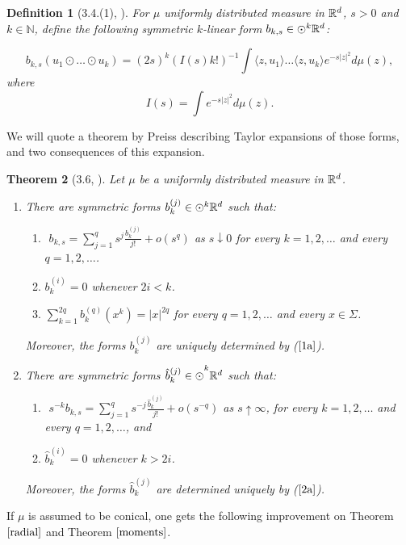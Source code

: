 \documentclass[11pt]{article}
\newtheorem{theorem}{Theorem}[section]
\newtheorem{definition}[theorem]{Definition}
\theoremstyle{definition}
\theoremstyle{remark}
\numberwithin{equation}{section}
\newcommand{\NN}{\mathbb{N}}
\begin{document}
\begin{definition}[3.4.(1), \cite{P}]
For $\mu$ uniformly distributed measure in $\mathbb{R}^d$, $s>0$ and $k \in \NN$, define the following symmetric $k$-linear form $b_{k,s} \in {\odot}^{k} {\mathbb{R}}^d$:

\begin{equation} 
b_{k,s}(u_1 \odot \ldots \odot u_k)= (2s)^k {(I(s) k!)}^{-1} \int \langle z,u_1 \rangle \ldots \langle z,u_k \rangle e^{-s|z|^{2}} d\mu(z), 
\end{equation}
where $$ I(s)= \int e^{-s|z|^2} d\mu(z). $$
\end{definition}

We will quote a theorem by Preiss describing Taylor expansions of those forms, and two consequences of this expansion.

\begin{theorem}[3.6, \cite{P}] \label{moments}
Let $\mu$ be a uniformly distributed measure in $\mathbb{R}^d$. 
\begin{enumerate}
\item There are symmetric forms $b_{k}^{(j)} \in {\odot} ^{k} \mathbb{R}^d$ such that:
  \begin{enumerate}
  \item $\label{1a}$ $b_{k,s}= \sum_{j=1}^{q} s^{j} \frac{b_{k}^{(j)}}{j!} + o(s^q)$ as $s \downarrow 0$ for every $k=1,2,\ldots$ and every $q=1,2,\ldots$. 
  \item $b_{k}^{(i)}=0$ whenever $2i<k$.
  \item$\sum_{k=1}^{2q} b_{k}^{(q)}(x^k)= {|x|}^{2q}$ for every $q=1,2,\ldots$ and every $x \in \Sigma$.
  \end{enumerate}
  Moreover, the forms $b_{k}^{(j)}$ are uniquely determined by ($\ref{1a}$).
  \item There are symmetric forms ${{\hat{b}}_{k}^{(j)} \in \odot} ^{k} \mathbb{R}^d$ such that:
  \begin{enumerate}
  \item $\label{2a}$ $s^{-k} b_{k,s}=\sum_{j=1}^{q} s^{-j} \frac{{\hat{b}}_{k}^{(j)}}{j!} + o(s^{-q})$ as $s \uparrow \infty$, for every $k=1,2,\ldots$ and every $q=1,2,\ldots$, and
  \item ${\hat{b}}_{k}^{(i)}=0$ whenever $k>2i$.
  \end{enumerate}
  Moreover, the forms ${\hat{b}}_{k}^{(j)}$ are determined uniquely by ($\ref{2a}$).
  \end{enumerate}
\end{theorem}
 
 If $\mu $ is assumed to be conical, one gets the following improvement on Theorem $\ref{radial}$ and Theorem $\ref{moments}$. 
\end{document}
